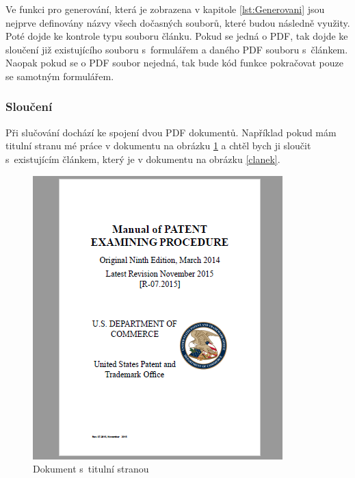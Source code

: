 \documentclass[czech,BP]{thesiskiv}
\begin{document}
Ve funkci pro generování, která je zobrazena v kapitole \ref{lst:Generovani} jsou nejprve definovány názvy všech dočasných souborů, které budou následně využity. Poté dojde ke kontrole typu souboru článku. Pokud se jedná o PDF, tak dojde ke sloučení již existujícího souboru s~formulářem a daného PDF souboru s~článkem. Naopak pokud se o PDF soubor nejedná, tak bude kód funkce pokračovat pouze se samotným formulářem.
\subsubsection{Sloučení}
Při slučování dochází ke spojení dvou PDF dokumentů. Například pokud mám titulní stranu mé práce v dokumentu na obrázku \ref{titulni_strana} a chtěl bych ji sloučit s~existujícím článkem, který je v dokumentu na obrázku \ref{clanek}.
\begin{figure}[h]
    \centering
    \begin{minipage}[b]{0.4\textwidth}
    	\includegraphics[width=\textwidth]{obr2.png}
    	\caption{Dokument s~titulní stranou}
    	\label{titulni_strana}
    \end{minipage}
    \hfill
    \begin{minipage}[b]{0.4\textwidth}

\end{minipage}
\end{figure}
\end{document}
